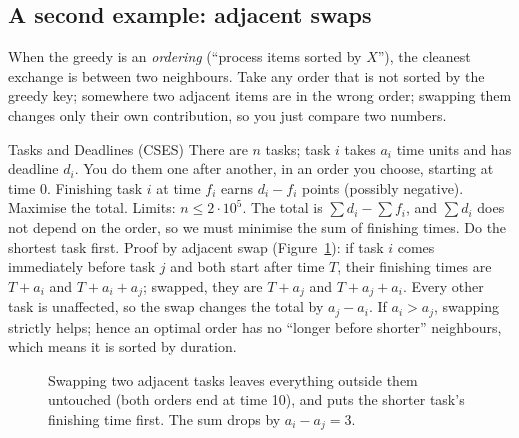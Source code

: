 \subsection{A second example: adjacent swaps}

When the greedy is an \emph{ordering} (``process items sorted by $X$''), the cleanest exchange is between two neighbours.
Take any order that is not sorted by the greedy key; somewhere two adjacent items are in the wrong order; swapping them
changes only their own contribution, so you just compare two numbers.

\begin{problem}{Tasks and Deadlines (CSES)}
There are $n$ tasks; task $i$ takes $a_i$ time units and has deadline $d_i$. You do them one after another, in an order you
choose, starting at time 0. Finishing task $i$ at time $f_i$ earns $d_i - f_i$ points (possibly negative). Maximise the
total. Limits: $n \le 2 \cdot 10^5$.
\solution The total is $\sum d_i - \sum f_i$, and $\sum d_i$ does not depend on the order, so we must minimise the sum of
finishing times. Do the shortest task first. Proof by adjacent swap (Figure~\ref{fig:exchange-swap}): if task $i$ comes
immediately before task $j$ and both start after time $T$, their finishing times are $T + a_i$ and $T + a_i + a_j$; swapped,
they are $T + a_j$ and $T + a_j + a_i$. Every other task is unaffected, so the swap changes the total by $a_j - a_i$. If
$a_i > a_j$, swapping strictly helps; hence an optimal order has no ``longer before shorter'' neighbours, which means it is
sorted by duration.
\end{problem}

\begin{figure}[htbp]
\centering
{}
\caption{Swapping two adjacent tasks leaves everything outside them untouched (both orders end at time 10), and puts the
shorter task's finishing time first. The sum drops by $a_i - a_j = 3$.}
\label{fig:exchange-swap}
\end{figure}

